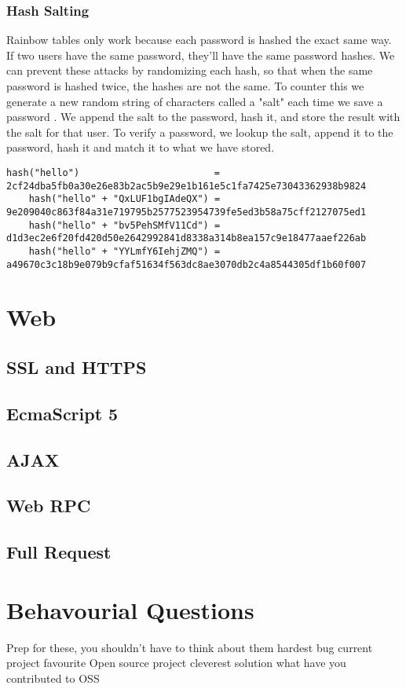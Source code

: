 \documentclass{article}
\begin{document}
		\subsubsection{Hash Salting}
		Rainbow tables only work because each password is hashed the exact same way. If two users have the same password, they'll have the same password hashes. We can prevent these attacks by randomizing each hash, so that when the same password is hashed twice, the hashes are not the same. To counter this we generate a new random string of characters called a "salt" each time we save a password . We append the salt to the password, hash it, and store the result with the salt for that user. To verify a password, we lookup the salt, append it to the password, hash it and match it to what we have stored.
		\begin{lstlisting}[style=pseudo, basicstyle={\footnotesize\ttfamily}]
	hash("hello")                        = 2cf24dba5fb0a30e26e83b2ac5b9e29e1b161e5c1fa7425e73043362938b9824
	hash("hello" + "QxLUF1bgIAdeQX") = 9e209040c863f84a31e719795b2577523954739fe5ed3b58a75cff2127075ed1
	hash("hello" + "bv5PehSMfV11Cd") = d1d3ec2e6f20fd420d50e2642992841d8338a314b8ea157c9e18477aaef226ab
	hash("hello" + "YYLmfY6IehjZMQ") = a49670c3c18b9e079b9cfaf51634f563dc8ae3070db2c4a8544305df1b60f007
		\end{lstlisting}

\clearpage
\section{Web}
	\subsection{SSL and HTTPS}
	\subsection{EcmaScript 5}
	\subsection{AJAX}
	\subsection{Web RPC}
	\subsection{Full Request}
\clearpage
\section{Behavourial Questions}
	Prep for these, you shouldn't have to think about them
	hardest bug
	current project
	favourite Open source project
	cleverest solution
	what have you contributed to OSS
\end{document}
